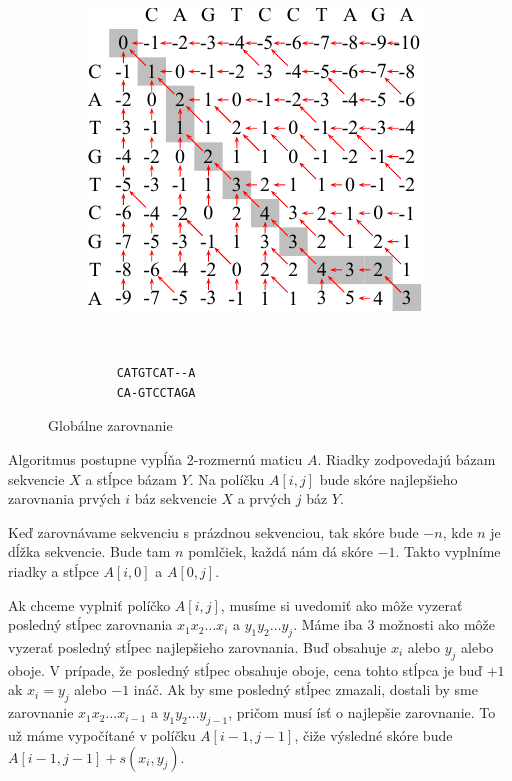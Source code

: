 \begin{figure}[htp]
    \centering
    \begin{subfigure}[m]{0.5\textwidth}
    \centering
    \includegraphics[width=\textwidth]{images/global_alignment}
    \end{subfigure}
    ~
    \begin{subfigure}[m]{0.3\textwidth}
    \centering
    \begin{verbatim}
    CATGTCAT--A
    CA-GTCCTAGA
    \end{verbatim}
    \end{subfigure}
    \caption{Globálne zarovnanie}
    \label{fig:global-align}
\end{figure}

Algoritmus postupne vypĺňa 2-rozmernú maticu $A$. Riadky zodpovedajú bázam sekvencie $X$ a stĺpce bázam $Y$. Na políčku $A[i,j]$ bude skóre najlepšieho zarovnania prvých $i$ báz sekvencie $X$ a prvých $j$ báz $Y$.

Keď zarovnávame sekvenciu s prázdnou sekvenciou, tak skóre bude $-n$, kde $n$ je dĺžka sekvencie. Bude tam $n$ pomlčiek, každá nám dá skóre $-1$. Takto vyplníme riadky a stĺpce $A[i,0]$ a $A[0,j]$.

Ak chceme vyplniť políčko $A[i,j]$, musíme si uvedomiť ako môže vyzerať posledný stĺpec zarovnania $x_1x_2\dots x_i$ a $y_1y_2\dots y_j$. Máme iba 3 možnosti ako môže vyzerať posledný stĺpec najlepšieho zarovnania. Buď obsahuje $x_i$ alebo $y_j$ alebo oboje. V prípade, že posledný stĺpec obsahuje oboje, cena tohto stĺpca je buď $+1$ ak $x_i = y_j$ alebo $-1$ ináč. Ak by sme posledný stĺpec zmazali, dostali by sme zarovnanie $x_1x_2\dots x_{i-1}$ a $y_1y_2\dots y_{j-1}$, pričom musí ísť o najlepšie zarovnanie. To už máme vypočítané v políčku $A[i-1, j-1]$, čiže výsledné skóre bude $A[i-1, j-1] + s(x_i,y_j)$.

